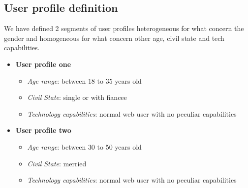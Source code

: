 \subsection{User profile definition}
We have defined 2 segments of user profiles heterogeneous for what concern the gender and homogeneous for what concern 	other age, civil state and tech capabilities.
\begin{itemize}
		\item \textbf{User profile one}
			\begin{itemize}
				\item \emph{Age range}: between 18 to 35 years old
				\item \emph{Civil State}: single or with fiancee
				\item \emph{Technology capabilities}: normal web user with no peculiar capabilities
			\end{itemize}
		\item \textbf{User profile two}
			\begin{itemize}
				\item \emph{Age range}: between 30 to 50 years old
				\item \emph{Civil State}: merried
				\item \emph{Technology capabilities}: normal web user with no peculiar capabilities
			\end{itemize}
\end{itemize}


